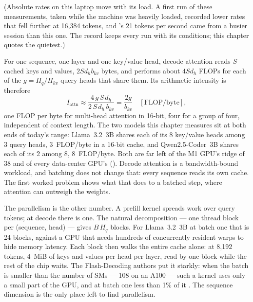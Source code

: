 (Absolute rates on this laptop move with its load. A first run of these
measurements, taken while the machine was heavily loaded, recorded lower rates
that fell further at 16,384 tokens, and 's 21 tokens per
second came from a busier session than this one. The record keeps every run
with its conditions; this chapter quotes the quietest.)



For one sequence, one layer and one key/value head, decode attention reads
$S$ cached keys and values, $2Sd_hb_{kv}$ bytes, and performs about
$4Sd_h$ FLOPs for each of the $g=H_q/H_{kv}$ query heads that share them. Its
arithmetic intensity is therefore
\begin{equation}
I_{\text{attn}} \approx \frac{4\,g\,S\,d_h}{2\,S\,d_h\,b_{kv}} = \frac{2g}{b_{kv}}
\quad[\text{FLOP/byte}],
\label{eq:attn-intensity}
\end{equation}
one FLOP per byte for multi-head attention in 16-bit, four for a group of four,
independent of context length. The two models this chapter measures sit at
both ends of today's range: Llama~3.2~3B shares each of its 8 key/value heads
among 3 query heads, 3~FLOP/byte in a 16-bit cache, and Qwen2.5-Coder~3B shares
each of its 2 among 8, 8~FLOP/byte. Both are far left of the M1 GPU's ridge of
38 and of every data-center GPU's (). Decode attention is a
bandwidth-bound workload, and batching does not change that: every sequence
reads its own cache. The first worked problem shows what that does to a
batched step, where attention can outweigh the weights.

The parallelism is the other number. A prefill kernel spreads work over query
tokens; at decode there is one. The natural decomposition --- one thread block
per (sequence, head) --- gives $B\,H_q$ blocks. For Llama~3.2~3B at batch one
that is 24 blocks, against a GPU that needs hundreds of concurrently resident
warps to hide memory latency. Each block then walks the entire cache alone:
at 8,192 tokens, 4~MiB of keys and values per head per layer, read by one
block while the rest of the chip waits. The Flash-Decoding authors put it
starkly: when the batch is smaller than the number of SMs --- 108 on an A100 ---
such a kernel uses only a small part of the GPU, and at batch one less than 1\%
of it \cite{dao2023flashdecoding}. The sequence dimension is the only place left
to find parallelism.

